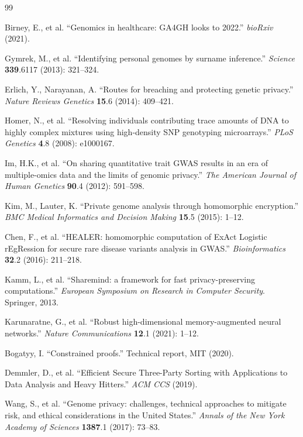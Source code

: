 \documentclass[11pt,letterpaper]{article}
\begin{document}
\begin{thebibliography}{99}

 Birney, E., et al. ``Genomics in healthcare: GA4GH looks to 2022.'' \textit{bioRxiv} (2021).

 Gymrek, M., et al. ``Identifying personal genomes by surname inference.'' \textit{Science} \textbf{339}.6117 (2013): 321--324.

 Erlich, Y., Narayanan, A. ``Routes for breaching and protecting genetic privacy.'' \textit{Nature Reviews Genetics} \textbf{15}.6 (2014): 409--421.

 Homer, N., et al. ``Resolving individuals contributing trace amounts of DNA to highly complex mixtures using high-density SNP genotyping microarrays.'' \textit{PLoS Genetics} \textbf{4}.8 (2008): e1000167.

 Im, H.K., et al. ``On sharing quantitative trait GWAS results in an era of multiple-omics data and the limits of genomic privacy.'' \textit{The American Journal of Human Genetics} \textbf{90}.4 (2012): 591--598.

 Kim, M., Lauter, K. ``Private genome analysis through homomorphic encryption.'' \textit{BMC Medical Informatics and Decision Making} \textbf{15}.5 (2015): 1--12.

 Chen, F., et al. ``HEALER: homomorphic computation of ExAct Logistic rEgRession for secure rare disease variants analysis in GWAS.'' \textit{Bioinformatics} \textbf{32}.2 (2016): 211--218.

 Kamm, L., et al. ``Sharemind: a framework for fast privacy-preserving computations.'' \textit{European Symposium on Research in Computer Security}. Springer, 2013.

 Karunaratne, G., et al. ``Robust high-dimensional memory-augmented neural networks.'' \textit{Nature Communications} \textbf{12}.1 (2021): 1--12.

 Bogatyy, I. ``Constrained proofs.'' Technical report, MIT (2020).

 Demmler, D., et al. ``Efficient Secure Three-Party Sorting with Applications to Data Analysis and Heavy Hitters.'' \textit{ACM CCS} (2019).

 Wang, S., et al. ``Genome privacy: challenges, technical approaches to mitigate risk, and ethical considerations in the United States.'' \textit{Annals of the New York Academy of Sciences} \textbf{1387}.1 (2017): 73--83.


\end{thebibliography}
\end{document}
